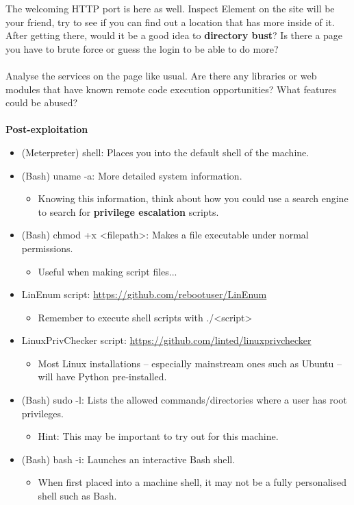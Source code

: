 \documentclass[a4paper,11pt]{article}
\renewcommand{\tt}[2][tt]{\textcolor{#1}{\ttfamily #2}}%
\begin{document}
The welcoming HTTP port is here as well. Inspect Element on the site will be your friend, try to see if you can find out a location that has more inside of it. After getting there, would it be a good idea to {\bfseries directory bust}? Is there a page you have to brute force or guess the login to be able to do more?
\\
\\
Analyse the services on the page like usual. Are there any libraries or web modules that have known remote code execution opportunities? What features could be abused?
\\
\\
{\bfseries Post-exploitation}

\begin{itemize}
    \item (Meterpreter) \tt{shell}: Places you into the default shell of the machine.
    \item (Bash) \tt{uname -a}: More detailed system information.
    \begin{itemize}
        \item Knowing this information, think about how you could use a search engine to search for {\bfseries privilege escalation} scripts.
    \end{itemize}
    \item (Bash) \tt{chmod +x <filepath>}: Makes a file executable under normal permissions.
    \begin{itemize}
        \item Useful when making script files...
    \end{itemize}
    \item LinEnum script: \url{https://github.com/rebootuser/LinEnum}
    \begin{itemize}
        \item Remember to execute shell scripts with \tt{./<script>}
    \end{itemize}
    \item LinuxPrivChecker script: \url{https://github.com/linted/linuxprivchecker}
    \begin{itemize}
        \item Most Linux installations -- especially mainstream ones such as Ubuntu -- will have Python pre-installed.
    \end{itemize}
    \item (Bash) \tt{sudo -l}: Lists the allowed commands/directories where a user has root privileges.
    \begin{itemize}
        \item Hint: This may be important to try out for this machine.
    \end{itemize}
    \item (Bash) \tt{bash -i}: Launches an interactive Bash shell.
    \begin{itemize}
        \item When first placed into a machine shell, it may not be a fully personalised shell such as Bash.
    \end{itemize}
\end{itemize}
\pagebreak
\end{document}
